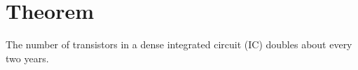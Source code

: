 \section{Theorem}
\begin{thm}
    The number of transistors in a dense integrated circuit (IC) doubles about every two years.
\end{thm}

